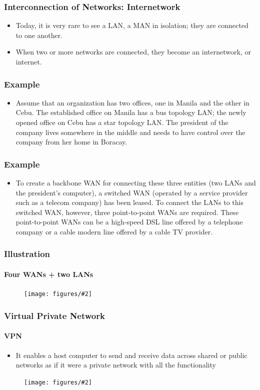 \documentclass{beamer}
\newcommand{\fig}[2]{
\begin{center}
\begin{figure}
\texttt{[image: figures/\#2]}
\end{figure}
\end{center}
}
\begin{document}
\begin{frame}
\frametitle{Interconnection of Networks: Internetwork}
\begin{itemize} 
\Large
\item <2-> Today, it is very rare to see a LAN, a MAN in isolation; they are connected to one another.
\item <3-> When two or more networks are connected, they become an internetwork, or internet.
\end{itemize}

\end{frame}


\begin{frame}
\frametitle{Example}
\begin{itemize} 
\Large
\item <1-> Assume that an organization has two offices, one in Manila
and the other in Cebu. The established office on Manila has a bus topology LAN; the newly opened office on Cebu has a star topology LAN. The president of
the company lives somewhere in the middle and needs to have control over the company from her home in Boracay.
\end{itemize}

\end{frame}

\begin{frame}
\frametitle{Example}
\begin{itemize} 
\Large
\item <1-> To create a backbone WAN for connecting these three entities (two
LANs and the president's computer), a switched WAN (operated by a service provider
such as a telecom company) has been leased. To connect the LANs to this switched
WAN, however, three point-to-point WANs are required. These point-to-point WANs
can be a high-speed DSL line offered by a telephone company or a cable modern line
offered by a cable TV provider.
\end{itemize}

\end{frame}


\begin{frame}
\frametitle{Illustration}
\framesubtitle{Four WANs + two LANs}
\fig{0.42}{network_ex}
\end{frame}



\begin{frame}
\frametitle{\huge Virtual Private Network}
\framesubtitle{VPN}
\begin{itemize} 
\Large
\item <2-> It enables a host computer to send and receive data across shared or public networks as if it were a private network with all the functionality
\end{itemize}
 
\fig{0.3}{network_vpn}
\end{frame}
\end{document}

